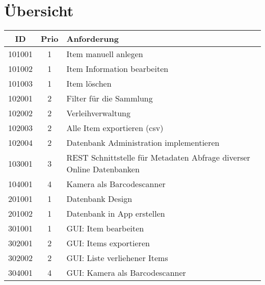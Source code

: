 \section{Übersicht}

\begin{table} [htbp]
	\begin{tabular}{|c|c|l|}
			\rowcolor{black} {\color{white}\textbf{ID}} & {\color{white}\textbf{Prio}} & {\color{white}\textbf{Anforderung}} \\ \hline
				101001 & 1 & Item manuell anlegen \\ \hline
				\rowcolor{DarkSeaGreen} 101002 & 1 & Item Information bearbeiten \\ \hline
				101003 & 1 & Item löschen \\ \hline
				\rowcolor{DarkSeaGreen} 102001 & 2 & Filter für die Sammlung \\ \hline
				102002 & 2 & Verleihverwaltung \\ \hline
				\rowcolor{DarkSeaGreen} 102003 & 2 & Alle Item exportieren (csv) \\ \hline
				102004 & 2 & Datenbank Administration implementieren \\ \hline
				\rowcolor{DarkSeaGreen} 103001 & 3 & REST Schnittstelle für Metadaten Abfrage diverser Online Datenbanken \\ \hline
				104001 & 4 & Kamera als Barcodescanner \\ \hline
				\rowcolor{DarkSeaGreen} 201001 & 1 & Datenbank Design \\ \hline
				201002 & 1 & Datenbank in App erstellen \\ \hline
				\rowcolor{DarkSeaGreen} 301001 & 1 & GUI: Item bearbeiten \\ \hline
				302001 & 2 & GUI: Items exportieren \\ \hline
				\rowcolor{DarkSeaGreen} 302002 & 2 & GUI: Liste verliehener Items \\ \hline
				304001 & 4 & GUI: Kamera als Barcodescanner \\ \hline
	\end{tabular}
\end{table}